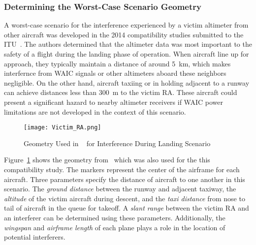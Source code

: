 \subsubsection{Determining the Worst-Case Scenario Geometry}
A worst-case scenario for the interference experienced by a victim altimeter from other aircraft was developed in the 2014 compatibility studies submitted to the ITU~\cite{noauthor_compatibility_2014}. The authors determined that the altimeter data was most important to the safety of a flight during the landing phase of operation. When aircraft line up for approach, they typically maintain a distance of around 5~km, which makes interfernce from WAIC signals or other altimeters aboard these neighbors negligible. On the other hand, aircraft taxiing or in holding adjacent to a runway can achieve distances less than 300~m to the victim RA. These aircraft could present a significant hazard to nearby altimeter receivers if WAIC power limitations are not developed in the context of this scenario. 

\begin{figure}[ht]
\centering
\texttt{[image: Victim\_RA.png]}
\caption{Geometry Used in ~\cite{noauthor_compatibility_2014} for Interference During Landing Scenario}

\label{fig:victim_ra}

\end{figure}

Figure~\ref{fig:victim_ra} shows the geometry from~\cite{noauthor_compatibility_2014} which was also used for the this compatibility study. The markers represent the center of the airframe for each aircraft. Three parameters specify the distance of aircraft to one another in this scenario. The \textit{ground distance} between the runway and adjacent taxiway, the \textit{altitude} of the victim aircraft during descent, and the \textit{taxi distance} from nose to tail of aircraft in the queue for takeoff. A \textit{slant range} between the victim RA and an interferer can be determined using these parameters. Additionally, the \textit{wingspan} and \textit{airframe length} of each plane plays a role in the location of potential interferers.

